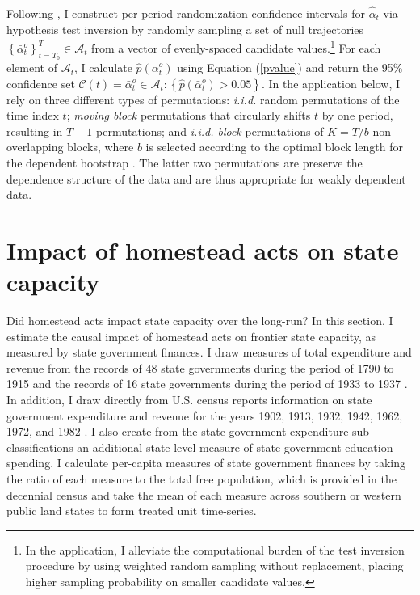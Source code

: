\documentclass[12pt]{article}
\begin{document}
Following \citet{chernozhukov2017exact,chernozhukov2018exact}, I construct per-period randomization confidence intervals for $\hat{\bar{\alpha}}_{t}$ via hypothesis test inversion by randomly sampling a set of null trajectories $\left\{\bar{\alpha}^{o}_{t}\right\}_{t=T_0}^T \in \mathcal{A}_t$ from a vector of evenly-spaced candidate values.\footnote{In the application, I alleviate the computational burden of the test inversion procedure by using weighted random sampling without replacement, placing higher sampling probability on smaller candidate values.} For each element of $\mathcal{A}_t$, I calculate $\hat{p} (\bar{\alpha}^{o}_{t})$ using Equation (\ref{pvalue}) and return the 95\% confidence set  $\mathcal{C} (t) = \bar{\alpha}^{o}_{t} \in \mathcal{A}_t: \left\{\hat{p} (\bar{\alpha}^{o}_{t}) > 0.05\right\}$. In the application below, I rely on three different types of permutations: \emph{i.i.d.} random permutations of the time index $t$; \emph{moving block} permutations that circularly shifts $t$ by one period, resulting in $T-1$ permutations; and \emph{i.i.d. block} permutations of $K=T/b$ non-overlapping blocks, where $b$ is selected according to the optimal block length for the dependent bootstrap \citep{politis2004automatic}. The latter two permutations are preserve the dependence structure of the data and are thus appropriate for weakly dependent data. 

\section{Impact of homestead acts on state capacity} \label{state-capacity}

Did homestead acts impact state capacity over the long-run? In this section, I estimate the causal impact of homestead acts on frontier state capacity, as measured by state government finances. I draw measures of total expenditure and revenue from the records of 48 state governments during the period of 1790 to 1915 and the records of 16 state governments during the period of 1933 to 1937 \citep{sylla1993sources,sylla1995sourcesa,sylla1995sourcesb}. In addition, I draw directly from U.S. census reports information on state government expenditure and revenue for the years 1902, 1913, 1932, 1942, 1962, 1972, and 1982  \citep{haines2010}. I also create from the state government expenditure sub-classifications an additional state-level measure of state government education spending. I calculate per-capita measures of state government finances by taking the ratio of each measure to the total free population, which is provided in the decennial census \citep{haines2010} and take the mean of each measure  across southern or western public land states to form treated unit time-series.
\end{document}
